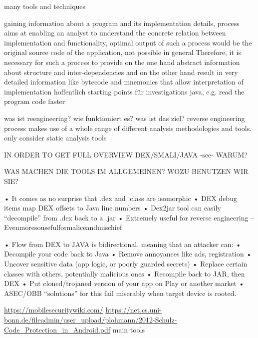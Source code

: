 many tools and techniques

gaining information about a program and its implementation
details, process aims at enabling an analyst to understand the concrete
relation between implementation and functionality, optimal output
of such a process would be the original source code of the application, not possible in general\newline
Therefore, it is necessary for such a process to provide on the one hand abstract information about structure and inter-dependencies and on the other hand result in very detailed information like bytecode and mnemonics that allow interpretation of implementation\newline
hoffentlich starting points für investigations\newline
java, e.g. read the program code faster\newline


was ist reengineering? wie funktioniert es? was ist das ziel?\newline
reverse engineering process makes use of a whole range of different analysis
methodologies and tools.\newline
only consider static analysis tools\newline

IN ORDER TO GET FULL OVERVIEW DEX/SMALI/JAVA -see- WARUM?\newline

WAS MACHEN DIE TOOLS IM ALLGEMEINEN? WOZU BENUTZEN WIR SIE?\newline

• It comes as no surprise that .dex and .class are isomorphic
• DEX debug items map DEX offsets to Java line numbers
• Dex2jar tool can easily “decompile” from .dex back to a .jar
•  Extremely useful for reverse engineering – Evenmoresousefulformaliceandmischief

• Flow from DEX to JAVA is bidirectional, meaning that an attacker can:
• Decompile your code back to Java
• Remove annoyances like ads, registration
• Uncover sensitive data (app logic, or poorly guarded secrets)
• Replace certain classes with others, potentially malicious ones
• Recompile back to JAR, then DEX
• Put cloned/trojaned version of your app on Play or another market
• ASEC/OBB “solutions” for this fail miserably when target device is rooted.


\url{https://mobilesecuritywiki.com/}\newline
\url{https://net.cs.uni-bonn.de/fileadmin/user_upload/plohmann/2012-Schulz-Code_Protection_in_Android.pdf}\newline
main tools\newline
